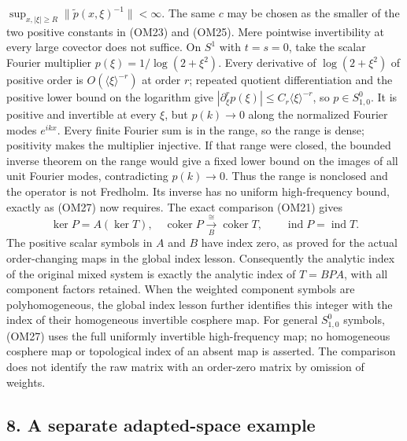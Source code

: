 \documentclass[
  11pt,
]{article}
\makeatletter
\let\ReaderOriginalAnchorStart\hyper@anchorstart
\let\ReaderOriginalAnchorEnd\hyper@anchorend
\let\ReaderPendingAliases\@empty
\def\ReaderArmAliases#1{\gdef\ReaderPendingAliases{#1}}
\def\hyper@anchorstart#1{\ReaderIfNativeAnchorTF{#1}{\ReaderPendingAliases\global\let\ReaderPendingAliases\@empty}{}\ReaderOriginalAnchorStart{#1}}
\makeatother
\begin{document}
\(\sup_{x,|\xi|\ge R}\|\widetilde p(x,\xi)^{-1}\|<\infty\). The same
\(c\) may be chosen as the smaller of the two positive constants in
(OM23) and (OM25). Mere pointwise invertibility at every large covector
does not suffice. On \(S^1\) with \(t=s=0\), take the scalar Fourier
multiplier \(p(\xi)=1/\log(2+\xi^2)\). Every derivative of
\(\log(2+\xi^2)\) of positive order is \(O(\langle\xi\rangle^{-r})\) at
order \(r\); repeated quotient differentiation and the positive lower
bound on the logarithm give
\(|\partial_\xi^r p(\xi)|\le C_r\langle\xi\rangle^{-r}\), so
\(p\in S^0_{1,0}\). It is positive and invertible at every \(\xi\), but
\(p(k)\to0\) along the normalized Fourier modes \(e^{ikx}\). Every
finite Fourier sum is in the range, so the range is dense; positivity
makes the multiplier injective. If that range were closed, the bounded
inverse theorem on the range would give a fixed lower bound on the
images of all unit Fourier modes, contradicting \(p(k)\to0\). Thus the
range is nonclosed and the operator is not Fredholm. Its inverse has no
uniform high-frequency bound, exactly as (OM27) now requires. The exact
comparison (OM21) gives \[
 \ker P=A(\ker T),\quad
 \operatorname{coker}P\xrightarrow[\ B\ ]{\cong}\operatorname{coker}T,
 \qquad \operatorname{ind}P=\operatorname{ind}T.
 \tag{OM28}
\] The positive scalar symbols in \(A\) and \(B\) have index zero, as
proved for the actual order-changing maps in the global index lesson.
Consequently the analytic index of the original mixed system is exactly
the analytic index of \(T=BPA\), with all component factors retained.
When the weighted component symbols are polyhomogeneous, the global
index lesson further identifies this integer with the index of their
homogeneous invertible cosphere map. For general \(S^0_{1,0}\) symbols,
(OM27) uses the full uniformly invertible high-frequency map; no
homogeneous cosphere map or topological index of an absent map is
asserted. The comparison does not identify the raw matrix with an
order-zero matrix by omission of weights.

\ReaderArmAliases{\ReaderOriginalAnchorStart{AN03-OMF-008}\ReaderOriginalAnchorEnd\begingroup\expandafter\def\csname @currentHref\endcsname{AN03-OMF-008}\label{AN03-OMF-008}\endgroup\ReaderOriginalAnchorStart{8-a-separate-adapted-space-example}\ReaderOriginalAnchorEnd\begingroup\expandafter\def\csname @currentHref\endcsname{8-a-separate-adapted-space-example}\label{8-a-separate-adapted-space-example}\endgroup}
\subsection{8. A separate adapted-space
example}\label{a-separate-adapted-space-example}
\end{document}
